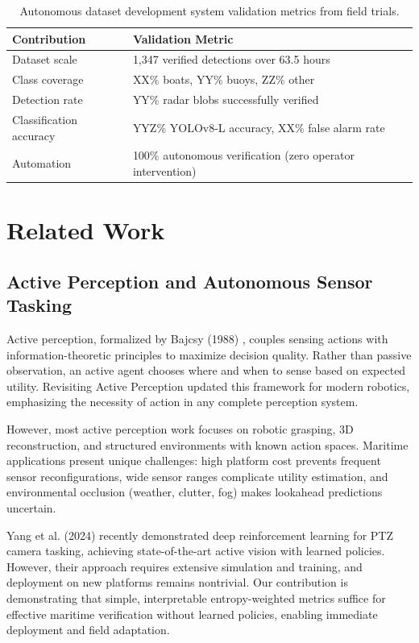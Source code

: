 \documentclass[conf]{asmeconf}
\begin{document}
\begin{table}[t]
\caption{Autonomous dataset development system validation metrics from field trials.}
\label{tab:contributions}
\centering
\small
\begin{tabular}{@{}lp{4.5cm}@{}}
\toprule
Contribution & Validation Metric \\
\midrule
Dataset scale & 1,347 verified detections over 63.5 hours \\
\midrule
Class coverage & XX\% boats, YY\% buoys, ZZ\% other \\
\midrule
Detection rate & YY\% radar blobs successfully verified \\
\midrule
Classification accuracy & YYZ\% YOLOv8-L accuracy, XX\% false alarm rate \\
\midrule
Automation & 100\% autonomous verification (zero operator intervention) \\
\bottomrule
\end{tabular}
\end{table}

\section{Related Work}

\subsection{Active Perception and Autonomous Sensor Tasking}

Active perception, formalized by Bajcsy (1988) \cite{Bajcsy1988ActivePerception}, couples sensing actions with information-theoretic principles to maximize decision quality. Rather than passive observation, an active agent chooses where and when to sense based on expected utility. Revisiting Active Perception \cite{BajcsyAloimonosTsotsos2016Revisiting} updated this framework for modern robotics, emphasizing the necessity of action in any complete perception system.

However, most active perception work focuses on robotic grasping, 3D reconstruction, and structured environments with known action spaces. Maritime applications present unique challenges: high platform cost prevents frequent sensor reconfigurations, wide sensor ranges complicate utility estimation, and environmental occlusion (weather, clutter, fog) makes lookahead predictions uncertain.

Yang et al. (2024) \cite{Yang2024PTZRL} recently demonstrated deep reinforcement learning for PTZ camera tasking, achieving state-of-the-art active vision with learned policies. However, their approach requires extensive simulation and training, and deployment on new platforms remains nontrivial. Our contribution is demonstrating that simple, interpretable entropy-weighted metrics suffice for effective maritime verification without learned policies, enabling immediate deployment and field adaptation.
\end{document}

